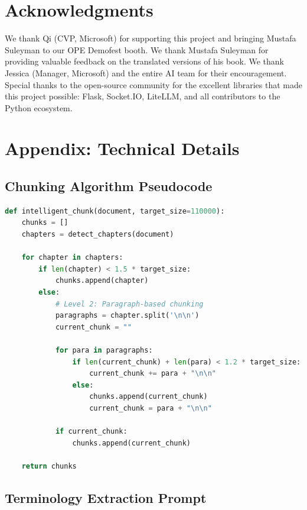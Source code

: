 \documentclass[11pt]{article}
\begin{document}
\section*{Acknowledgments}

We thank Qi (CVP, Microsoft) for supporting this project and bringing Mustafa Suleyman to our OPE Demofest booth. We thank Mustafa Suleyman for providing valuable feedback on the translated versions of his book. We thank Jessica (Manager, Microsoft) and the entire AI team for their encouragement. Special thanks to the open-source community for the excellent libraries that made this project possible: Flask, Socket.IO, LiteLLM, and all contributors to the Python ecosystem.




\appendix

\section{Appendix: Technical Details}

\subsection{Chunking Algorithm Pseudocode}

\begin{lstlisting}[language=Python,caption=Intelligent Chunking Algorithm]
def intelligent_chunk(document, target_size=110000):
    chunks = []
    chapters = detect_chapters(document)
    
    for chapter in chapters:
        if len(chapter) < 1.5 * target_size:
            chunks.append(chapter)
        else:
            # Level 2: Paragraph-based chunking
            paragraphs = chapter.split('\n\n')
            current_chunk = ""
            
            for para in paragraphs:
                if len(current_chunk) + len(para) < 1.2 * target_size:
                    current_chunk += para + "\n\n"
                else:
                    chunks.append(current_chunk)
                    current_chunk = para + "\n\n"
            
            if current_chunk:
                chunks.append(current_chunk)
    
    return chunks
\end{lstlisting}

\subsection{Terminology Extraction Prompt}
\end{document}
